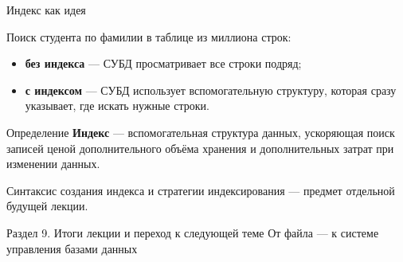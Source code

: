\documentclass[aspectratio=169]{beamer}
\begin{document}
\begin{frame}{Индекс как идея}

Поиск студента по фамилии в таблице из миллиона строк:

\vspace{0.3cm}

\begin{itemize}
  \item \textbf{без индекса} — СУБД просматривает
        все строки подряд;
  \item \textbf{с индексом} — СУБД использует
        вспомогательную структуру, которая сразу указывает,
        где искать нужные строки.
\end{itemize}

\vspace{0.4cm}

\begin{block}{Определение}
\textbf{Индекс} — вспомогательная структура данных,
ускоряющая поиск записей ценой дополнительного
объёма хранения и дополнительных затрат при изменении
данных.
\end{block}

\vspace{0.2cm}
\footnotesize
Синтаксис создания индекса и стратегии индексирования —
предмет отдельной будущей лекции.

\end{frame}



\begin{frame}{Раздел 9. Итоги лекции и переход к следующей теме}
\centering
\Large
От файла — к системе управления базами данных
\end{frame}
\end{document}
